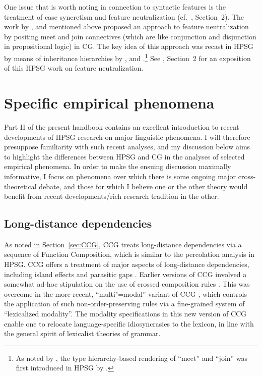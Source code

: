 \documentclass[output=paper
                ,modfonts
 	        ,biblatex
                ,babelshorthands
                ,newtxmath
                ,draftmode
                ,colorlinks, citecolor=brown
]{langscibook}
\begin{document}
One issue that is worth noting in connection to syntactic features is
the treatment of case syncretism and feature neutralization
(cf.~, Section~2). The work by
\citet[Chapter 6]{Morrill94a-u}, \citet{Bayer96} and \citet{BJ95} mentioned
above proposed an approach
to feature neutralization by positing meet and join connectives (which
are like conjunction and disjunction in propositional logic) in CG.
The key idea of this approach was recast in HPSG by means of
inheritance hierarchies by \citet{levy:01}, \citet{lev:pol:01} and
\citet{dani:01}.\footnote{As noted by \citet{levy:01}, the
  type hierarchy-based rendering of ``meet'' and ``join''
  was first introduced in HPSG by \citet[Section~6.3.2]{LHC2001a-u}.} See
, Section~2 for an 
exposition of this HPSG work on feature neutralization.


\section{Specific empirical phenomena \label{phenomena}}

Part II of the present handbook contains an excellent introduction to
recent developments of HPSG research on major linguistic phenomena. I
will therefore presuppose familiarity with such recent analyses, and my discussion below aims to highlight the
differences between HPSG and CG in the analyses of selected
empirical phenomena. In order to make the ensuing discussion maximally
informative, I focus on phenomena over which there is some ongoing
major cross-theoretical debate, and those for which I believe one or
the other theory would benefit from recent developments/rich research
tradition in the other.


\subsection{Long-distance dependencies}

As noted in Section~\ref{sec:CCG}, CCG treats long-distance
dependencies via a sequence of Function Composition, which is similar
to the \slasch percolation analysis in HPSG. CCG offers a treatment of
major aspects of long-distance dependencies, including island effects
\citep[Section~4.2]{Steedman2000a-u} and parasitic gaps \citep{Steedman87a-u}.
Earlier versions of CCG involved a somewhat ad-hoc stipulation on the
use of crossed composition rules \citep{Steedman97a}. This was
overcome in the more recent, ``multi"=modal'' variant of CCG
\citep{Baldridge2002a-u}, which controls the application of such
non-order-preserving rules via a fine-grained system of
``lexicalized modality''. The modality specifications in this new version of CCG
enable one to relocate language-specific idiosyncrasies to the
lexicon, in line with the general spirit of lexicalist theories of
grammar.
\end{document}
